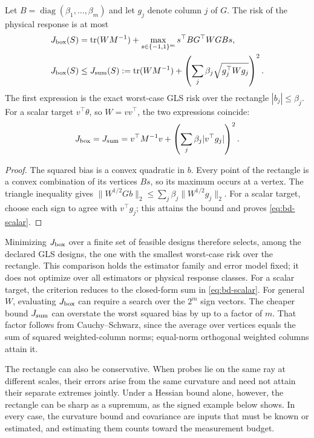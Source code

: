 \begin{corollary}\label{cor:bd-design}
Let $B=\operatorname{diag}(\beta_1,\ldots,\beta_m)$ and let $g_j$ denote
column $j$ of $G$. The risk of the physical response is at most
\begin{align}
 J_{\rm box}(S)&=\operatorname{tr}(WM^{-1})+
 \max_{s\in\{-1,1\}^m}s^\top BG^\top WGBs,\label{eq:bd-box}\\
 J_{\rm box}(S)&\leq J_{\rm sum}(S)
 :=\operatorname{tr}(WM^{-1})+
 \left(\sum_j\beta_j\sqrt{g_j^\top Wg_j}\right)^2.\label{eq:bd-sum}
\end{align}
The first expression is the exact worst-case GLS risk over the rectangle
$|b_j|\leq\beta_j$. For a scalar target $v^\top\theta$, so $W=vv^\top$,
the two expressions coincide:
\begin{equation}\label{eq:bd-scalar}
 J_{\rm box}=J_{\rm sum}
 =v^\top M^{-1}v+\left(\sum_j\beta_j|v^\top g_j|\right)^2.
\end{equation}
\end{corollary}
\begin{proof}
The squared bias is a convex quadratic in $b$. Every point of the rectangle
is a convex combination of its vertices $Bs$, so its maximum occurs at a
vertex. The triangle inequality gives
$\|W^{1/2}Gb\|_2\leq\sum_j\beta_j\|W^{1/2}g_j\|_2$.
For a scalar target, choose each sign to agree with $v^\top g_j$; this attains
the bound and proves \eqref{eq:bd-scalar}.
\end{proof}

Minimizing $J_{\rm box}$ over a finite set of feasible designs therefore
selects, among the declared GLS designs, the one with the smallest worst-case
risk over the rectangle. This comparison holds the estimator family and error
model fixed; it does not optimize over all estimators or physical response
classes. For a scalar target, the criterion reduces to the closed-form sum in
\eqref{eq:bd-scalar}. For general $W$, evaluating $J_{\rm box}$ can require a
search over the $2^m$ sign vectors. The cheaper bound $J_{\rm sum}$ can
overstate the worst squared bias by up to a factor of $m$. That factor follows
from Cauchy--Schwarz, since the average over vertices equals the sum of squared
weighted-column norms; equal-norm orthogonal weighted columns attain it.

The rectangle can also be conservative. When probes lie on the same ray at
different scales, their errors arise from the same curvature and need not
attain their separate extremes jointly. Under a Hessian bound alone, however,
the rectangle can be sharp as a supremum, as the signed example below shows.
In every case, the curvature bound and covariance are inputs that must be
known or estimated, and estimating them counts toward the measurement budget.

